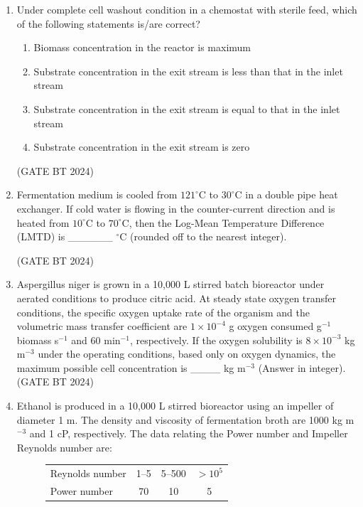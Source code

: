 \documentclass[journal,12pt,onecolumn]{IEEEtran}
\theoremstyle{remark}
\begin{document}
\begin{enumerate}
\item Under complete cell washout condition in a chemostat with sterile feed, which of the following statements is/are correct?  

\begin{enumerate}
    \item Biomass concentration in the reactor is maximum  
    \item Substrate concentration in the exit stream is less than that in the inlet stream  
    \item Substrate concentration in the exit stream is equal to that in the inlet stream  
    \item Substrate concentration in the exit stream is zero  
\end{enumerate}

\hfill (GATE BT 2024)

\item Fermentation medium is cooled from $121^\circ$C to $30^\circ$C in a double pipe heat exchanger. If cold water is flowing in the counter-current direction and is heated from $10^\circ$C to $70^\circ$C, then the Log-Mean Temperature Difference (LMTD) is \_\_\_\_\_\_ $^\circ$C (rounded off to the nearest integer).

\hfill (GATE BT 2024)

\item
Aspergillus niger is grown in a 10,000 L stirred batch bioreactor under aerated conditions to produce citric acid. At steady state oxygen transfer conditions, the specific oxygen uptake rate of the organism and the volumetric mass transfer coefficient are $1\times10^{-4}$ g oxygen consumed g$^{-1}$ biomass s$^{-1}$ and $60$ min$^{-1}$, respectively. If the oxygen solubility is $8\times10^{-3}$ kg m$^{-3}$ under the operating conditions, based only on oxygen dynamics, the maximum possible cell concentration is \_\_\_\_ kg m$^{-3}$ (Answer in integer).
\hfill (GATE BT 2024)

\item Ethanol is produced in a 10{,}000 L stirred bioreactor using an impeller of diameter 1 m. The density and viscosity of fermentation broth are 1000 kg m$^{-3}$ and 1 cP, respectively. The data relating the Power number and Impeller Reynolds number are:

\begin{figure}
\begin{tabular}{lccc}
\hline
Reynolds number & 1--5 & 5--500 & $> 10^5$ \\
Power number & 70 & 10 & 5 \\
\hline
\end{tabular}
\end{figure}


\end{enumerate}
\end{document}

